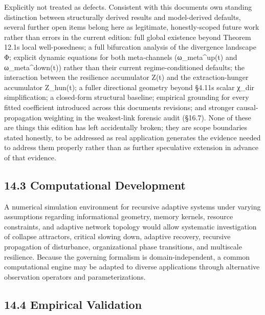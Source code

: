 \documentclass[
]{article}
\begin{document}
Explicitly not treated as defects. Consistent with this documents own
standing distinction between structurally derived results and
model-derived defaults, several further open items belong here as
legitimate, honestly-scoped future work rather than errors in the
current edition: full global existence beyond Theorem 12.1s local
well-posedness; a full bifurcation analysis of the divergence landscape
Φ; explicit dynamic equations for both meta-channels (ω\_meta\^{}up(t)
and ω\_meta\^{}down(t)) rather than their current regime-conditioned
defaults; the interaction between the resilience accumulator Z(t) and
the extraction-hunger accumulator Z\_hun(t); a fuller directional
geometry beyond §4.11s scalar χ\_dir simplification; a closed-form
structural baseline; empirical grounding for every fitted coefficient
introduced across this documents revisions; and stronger
causal-propagation weighting in the weakest-link forensic audit (§16.7).
None of these are things this edition has left accidentally broken; they
are scope boundaries stated honestly, to be addressed as real
application generates the evidence needed to address them properly
rather than as further speculative extension in advance of that
evidence.

\hypertarget{computational-development}{%
\subsection{14.3 Computational
Development}\label{computational-development}}

A numerical simulation environment for recursive adaptive systems under
varying assumptions regarding informational geometry, memory kernels,
resource constraints, and adaptive network topology would allow
systematic investigation of collapse attractors, critical slowing down,
adaptive recovery, recursive propagation of disturbance, organizational
phase transitions, and multiscale resilience. Because the governing
formalism is domain-independent, a common computational engine may be
adapted to diverse applications through alternative observation
operators and parameterizations.

\hypertarget{empirical-validation}{%
\subsection{14.4 Empirical Validation}\label{empirical-validation}}
\end{document}
